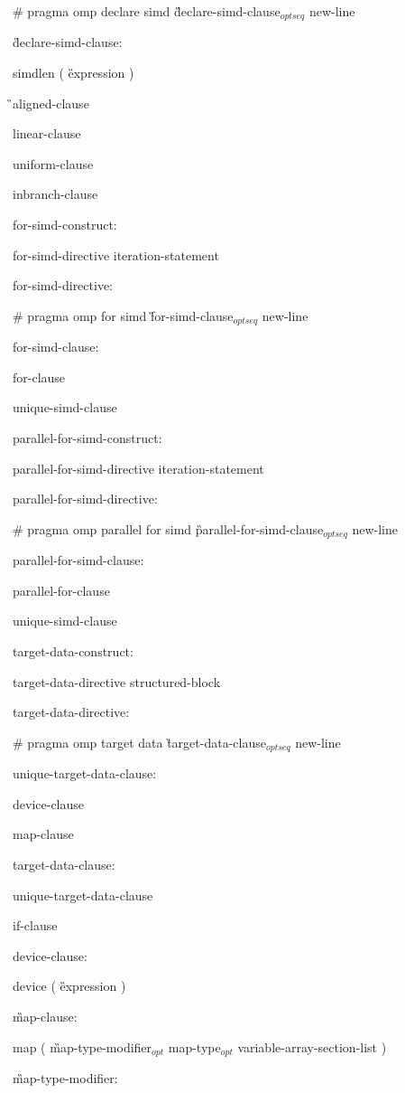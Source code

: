 {\C\I \# pragma omp declare simd \G declare-simd-clause$_{optseq}$ new-line

\G declare-simd-clause:

\C\I simdlen ( \G expression \C )

\G\I aligned-clause

\I linear-clause

\I uniform-clause

\I inbranch-clause

for-simd-construct:

\I for-simd-directive iteration-statement

for-simd-directive:

\C\I \# pragma omp for simd \G for-simd-clause$_{optseq}$ new-line

for-simd-clause:

\I for-clause

\I unique-simd-clause

parallel-for-simd-construct:

\I parallel-for-simd-directive iteration-statement

parallel-for-simd-directive:

\C\I \# pragma omp parallel for simd \G parallel-for-simd-clause$_{optseq}$ new-line

parallel-for-simd-clause:

\I parallel-for-clause

\I unique-simd-clause

target-data-construct:

\I target-data-directive structured-block

target-data-directive:

\C\I \# pragma omp target data \G target-data-clause$_{optseq}$ new-line

unique-target-data-clause:

\I device-clause

\I map-clause

target-data-clause:

\I unique-target-data-clause

\I if-clause

device-clause:

\C\I device ( \G expression \C )

\G map-clause:

\C\I map ( \G map-type-modifier$_{opt}$ map-type$_{opt}$ variable-array-section-list \C )

\G map-type-modifier:

}
